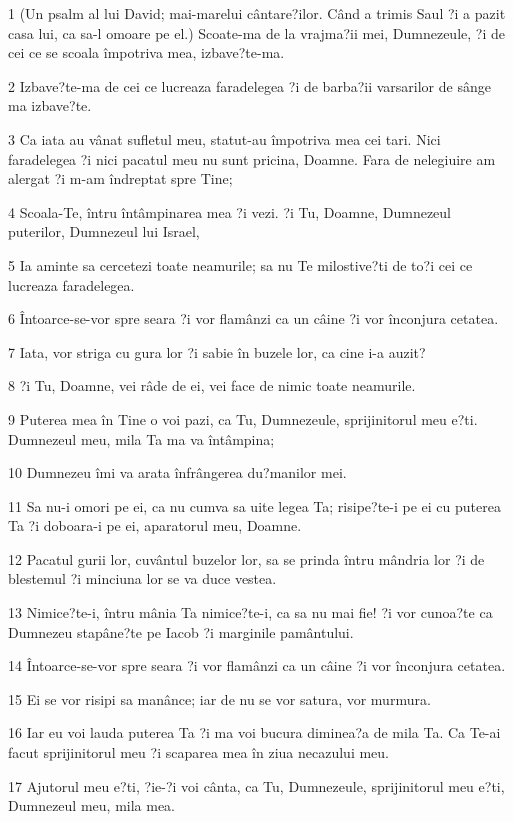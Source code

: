 \par 1 (Un psalm al lui David; mai-marelui cântare?ilor. Când a trimis Saul ?i a pazit casa lui, ca sa-l omoare pe el.) Scoate-ma de la vrajma?ii mei, Dumnezeule, ?i de cei ce se scoala împotriva mea, izbave?te-ma.
\par 2 Izbave?te-ma de cei ce lucreaza faradelegea ?i de barba?ii varsarilor de sânge ma izbave?te.
\par 3 Ca iata au vânat sufletul meu, statut-au împotriva mea cei tari. Nici faradelegea ?i nici pacatul meu nu sunt pricina, Doamne. Fara de nelegiuire am alergat ?i m-am îndreptat spre Tine;
\par 4 Scoala-Te, întru întâmpinarea mea ?i vezi. ?i Tu, Doamne, Dumnezeul puterilor, Dumnezeul lui Israel,
\par 5 Ia aminte sa cercetezi toate neamurile; sa nu Te milostive?ti de to?i cei ce lucreaza faradelegea.
\par 6 Întoarce-se-vor spre seara ?i vor flamânzi ca un câine ?i vor înconjura cetatea.
\par 7 Iata, vor striga cu gura lor ?i sabie în buzele lor, ca cine i-a auzit?
\par 8 ?i Tu, Doamne, vei râde de ei, vei face de nimic toate neamurile.
\par 9 Puterea mea în Tine o voi pazi, ca Tu, Dumnezeule, sprijinitorul meu e?ti. Dumnezeul meu, mila Ta ma va întâmpina;
\par 10 Dumnezeu îmi va arata înfrângerea du?manilor mei.
\par 11 Sa nu-i omori pe ei, ca nu cumva sa uite legea Ta; risipe?te-i pe ei cu puterea Ta ?i doboara-i pe ei, aparatorul meu, Doamne.
\par 12 Pacatul gurii lor, cuvântul buzelor lor, sa se prinda întru mândria lor ?i de blestemul ?i minciuna lor se va duce vestea.
\par 13 Nimice?te-i, întru mânia Ta nimice?te-i, ca sa nu mai fie! ?i vor cunoa?te ca Dumnezeu stapâne?te pe Iacob ?i marginile pamântului.
\par 14 Întoarce-se-vor spre seara ?i vor flamânzi ca un câine ?i vor înconjura cetatea.
\par 15 Ei se vor risipi sa manânce; iar de nu se vor satura, vor murmura.
\par 16 Iar eu voi lauda puterea Ta ?i ma voi bucura diminea?a de mila Ta. Ca Te-ai facut sprijinitorul meu ?i scaparea mea în ziua necazului meu.
\par 17 Ajutorul meu e?ti, ?ie-?i voi cânta, ca Tu, Dumnezeule, sprijinitorul meu e?ti, Dumnezeul meu, mila mea.

